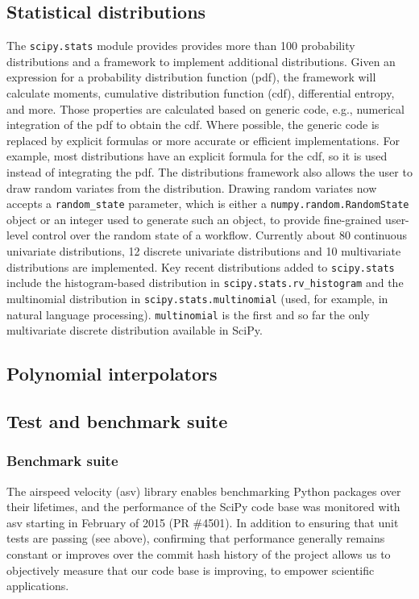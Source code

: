 \documentclass[fleqn,10pt]{wlscirep}
\begin{document}
\subsection*{Statistical distributions}
The \texttt{scipy.stats} module provides provides more than 100 probability
distributions and a framework to implement additional distributions. Given
an expression for a probability distribution function (pdf),
the framework will calculate moments, cumulative distribution function (cdf),
differential entropy, and more. Those properties are calculated based on
generic code, e.g., numerical integration of the pdf to obtain the cdf.
Where possible, the generic code is replaced by explicit formulas or more
accurate or efficient implementations. For example, most distributions have
an explicit formula for the cdf, so it is used instead of integrating the
pdf. The distributions framework also allows the user to draw random
variates from the distribution. Drawing random variates now accepts a \texttt{random\_state}
parameter, which is either a \texttt{numpy.random.RandomState} object or an
integer used to generate such an object, to provide fine-grained user-level
control over the random state of a workflow.
Currently about 80 continuous univariate distributions, 12 discrete univariate
distributions and 10 multivariate distributions are implemented.
Key recent distributions added to \texttt{scipy.stats} include the histogram-based
distribution in \texttt{scipy.stats.rv\_histogram} and the multinomial
distribution in \texttt{scipy.stats.multinomial} (used, for example, in natural
language processing\cite{Griffiths5228}). \texttt{multinomial} is the first and so 
far the only multivariate discrete distribution available in SciPy.


\subsection*{Polynomial interpolators}


\subsection*{Test and benchmark suite}

    \subsubsection*{Benchmark suite}

    The airspeed velocity (asv) library enables benchmarking Python packages over their lifetimes, and the performance of the SciPy
    code base was monitored with asv starting in February of 2015 (PR \#4501). In addition to ensuring that unit tests are passing (see above),
    confirming that performance generally remains constant or improves over the commit hash history of the project allows us to objectively
    measure that our code base is improving, to empower scientific applications.
\end{document}
